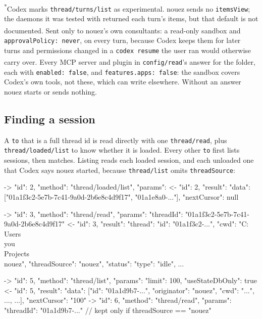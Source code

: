 \documentclass[10pt,a4paper]{article}
\newcommand{\code}[1]{\texttt{#1}}
\begin{document}
{\small \textsuperscript{*}Codex marks \code{thread/turns/list} as experimental. nouez sends no
\code{itemsView}; the daemons it was tested with returned each turn's items, but that default is
not documented.
\textsuperscript{\dag}Sent only to nouez's own consultants: a read-only sandbox and
\code{approvalPolicy: never}, on every turn, because Codex keeps them for later turns and
permissions changed in a \code{codex resume} the user ran would otherwise carry over.
\textsuperscript{\ddag}Every MCP server and plugin in \code{config/read}'s answer for the folder,
each with \code{enabled: false}, and \code{features.apps: false}: the sandbox covers Codex's own tools,
not these, which can write elsewhere. Without an answer nouez starts or sends nothing.}

\subsection{Finding a session}
\label{sec:resolve}

A \code{to} that is a full thread id is read directly with one \code{thread/read}, plus
\code{thread/loaded/list} to know whether it is loaded. Every other \code{to} first lists
sessions, then matches. Listing reads each loaded session, and each unloaded one that Codex says
nouez started, because \code{thread/list} omits \code{threadSource}:

\begin{wire}
-> {"id": 2, "method": "thread/loaded/list", "params": {}}
<- {"id": 2, "result": {"data": ["01a1f3c2-5e7b-7c41-9a0d-2b6e8c4d9f17", "01a1e8a0-..."], "nextCursor": null}}
\end{wire}
\begin{wire}
-> {"id": 3, "method": "thread/read", "params": {"threadId": "01a1f3c2-5e7b-7c41-9a0d-2b6e8c4d9f17"}}
<- {"id": 3, "result": {"thread": {"id": "01a1f3c2-...", "cwd": "C:\\Users\\you\\Projects\\nouez", "threadSource": "nouez", "status": {"type": "idle"}, ...}}}
\end{wire}
\begin{wire}
-> {"id": 5, "method": "thread/list", "params": {"limit": 100, "useStateDbOnly": true}}
<- {"id": 5, "result": {"data": [{"id": "01a1d9b7-...", "originator": "nouez", "cwd": "...", ...}, ...], "nextCursor": "100"}}
-> {"id": 6, "method": "thread/read", "params": {"threadId": "01a1d9b7-..."}}     // kept only if threadSource == "nouez"
\end{wire}
\end{document}
